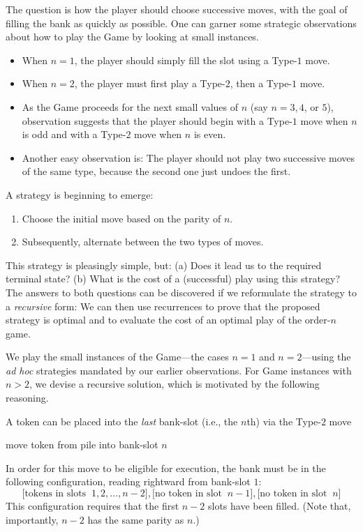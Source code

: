 The question is how the player should choose successive moves, with the goal of filling the bank as quickly as possible.  One can garner some strategic observations about how to play the Game by looking at small instances. 
\begin{itemize}
\item
When $n=1$, the player should simply fill the slot using a Type-$1$ move.
\item
When $n=2$, the player must first play a Type-$2$, then a Type-$1$ move. 
\item
As the Game proceeds for the next small values of $n$ (say $n=3, 4$, or $5$), observation suggests that the player should begin with a Type-$1$ move when $n$ is odd and with a Type-$2$ move when $n$ is even. 
\item
Another easy observation is: The player should not play two successive moves of the same type, because the second one just undoes the first.
\end{itemize}
A strategy is beginning to emerge:
\begin{enumerate}
\item
Choose the initial move based on the parity of $n$.
\item
Subsequently, alternate between the two types of moves.
\end{enumerate}
This strategy is pleasingly simple, but: (a) Does it lead us to the required terminal state?  (b) What is the cost of a (successful) play using this strategy?  The answers to both questions can be discovered if we reformulate the strategy to a {\em recursive} form:  We can then use recurrences to prove that the proposed strategy is optimal and to evaluate the cost of an optimal play of the order-$n$ game.

\bigskip

We play the small instances of the Game---the cases $n=1$ and $n=2$---using the {\it ad hoc} strategies mandated by our earlier observations.  For Game instances with $n > 2$, we devise a recursive solution, which is motivated by the following reasoning.

\medskip

A token can be placed into the {\em last} bank-slot (i.e., the $n$th) via the Type-$2$ move

\smallskip

\hspace*{.35in}
{\sc move token from pile into bank-slot} $n$

\smallskip

\noindent
In order for this move to be eligible for execution, the bank must be in the following configuration, reading rightward from bank-slot $1$:
\[ \big[ \mbox{tokens in slots } \ 1, 2, \ldots, n-2 \big],
 \big[ \mbox{no token in slot } \ n-1 \big],
 \big[ \mbox{no token in slot } \ n \big]
\]
This configuration requires that the first $n-2$ slots have been filled.  (Note that, importantly, $n-2$ has the same parity as $n$.)

